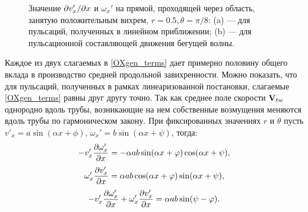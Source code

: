 \begin{figure}
\caption{Значение $\partial v_x' /\partial x$ и $\omega_x'$ на прямой, проходящей через область, занятую положительным вихрем, $r = 0.5, \theta = \pi/8$: (a) --- для пульсаций, полученных в линейном приближении; (b) --- для пульсационной составляющей движения бегущей волны. }
\label{OXgen_corr_pic}
\end{figure}


Каждое из двух слагаемых в \eqref{OXgen_terms} дает примерно половину общего вклада в производство средней продольной завихренности. Можно показать, что для пульсаций, полученных в рамках линеаризованной постановки, слагаемые \eqref{OXgen_terms} равны друг другу точно. Так как среднее поле скорости $\mathbf{V}_{tw}$ однородно вдоль трубы, возникающие на нем собственные возмущения меняются вдоль трубы по гармоническом закону. При фиксированных значениях $r$ и $\theta$ пусть  $v'_x = a \sin(\alpha x + \phi)$, $\omega_x' = b \sin(\alpha x + \psi)$, тогда:
\begin{equation} \label{OXgen_iterms_1}
 - v'_x \frac{\partial \omega'_x}{\partial x} = - \alpha a b \sin(\alpha x + \varphi) \cos(\alpha x + \psi),
\end{equation}
\begin{equation} \label{OXgen_iterms_2}
\omega'_x \frac{\partial v'_x}{\partial x} =  \alpha a b \cos(\alpha x + \varphi) \sin(\alpha x + \psi),
\end{equation}
\begin{equation} \label{OXgen_iterms_sum}
 - v'_x \frac{\partial \omega'_x}{\partial x} + \omega'_x \frac{\partial v'_x}{\partial x} = \alpha a b \sin(\psi - \varphi).
\end{equation}
